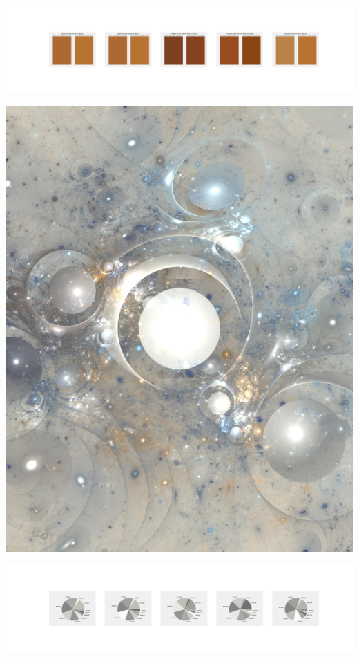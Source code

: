 \documentclass[11pt]{article}
\begin{document}
\begin{landscape}
    \begin{center}
    \includegraphics[width=250mm]{./nbimg/peak-60.jpg}
    \end{center}
    

    \begin{center}
    \includegraphics[width=\textwidth]{./nbimg/file (154).jpg}
    \end{center}

    \begin{center}
    \includegraphics[width=250mm]{./nbimg/pie-61.jpg}
    \end{center}


\end{landscape}
\end{document}
